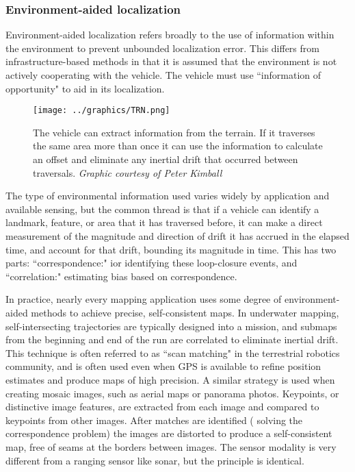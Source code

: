 \subsubsection{Environment-aided localization}

Environment-aided localization refers broadly to the use of information within the environment to prevent unbounded localization error. This differs from infrastructure-based methods in that it is assumed that the environment is not actively cooperating with the vehicle. The vehicle must use ``information of opportunity" to aid in its localization. 

\begin{figure}[htbp]
   \centering
   \texttt{[image: ../graphics/TRN.png]} %
   \caption{The vehicle can extract information from the terrain. If it traverses the same area more than once it can use the information to calculate an offset and eliminate any inertial drift that occurred between traversals. \emph{Graphic courtesy of Peter Kimball}}
   \label{fig:TRN}
\end{figure}

The type of environmental information used varies widely by application and available sensing, but the common thread is that if a vehicle can identify a landmark, feature, or area that it has traversed before, it can make a direct measurement of the magnitude and direction of drift it has accrued in the elapsed time, and account for that drift, bounding its magnitude in time. This has two parts: ``correspondence:" ior identifying these loop-closure events, and ``correlation:" estimating bias based on correspondence. 

In practice, nearly every mapping application uses some degree of environment-aided methods to achieve precise, self-consistent maps. In underwater mapping, self-intersecting trajectories are typically designed into a mission, and submaps from the beginning and end of the run are correlated to eliminate inertial drift. This technique is often referred to as ``scan matching" in the terrestrial robotics community, and is often used even when GPS is available to refine position estimates and produce maps of high precision. A similar strategy is used when creating mosaic images, such as aerial maps or panorama photos.  Keypoints, or distinctive image features, are extracted from each image and compared to keypoints from other images. After matches are identified ( solving the correspondence problem) the images are distorted to produce a self-consistent map, free of seams at the borders between images. The sensor modality is very different from a ranging sensor like sonar, but the principle is identical. 

